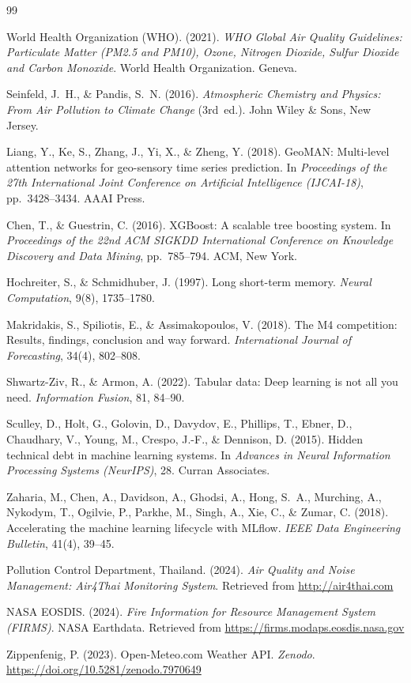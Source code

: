 \documentclass[12pt,a4paper]{report}
\begin{document}
\begin{thebibliography}{99}

World Health Organization (WHO). (2021).
\textit{WHO Global Air Quality Guidelines: Particulate Matter (PM2.5 and PM10), Ozone, Nitrogen Dioxide, Sulfur Dioxide and Carbon Monoxide}.
World Health Organization. Geneva.

Seinfeld, J.~H., \& Pandis, S.~N. (2016).
\textit{Atmospheric Chemistry and Physics: From Air Pollution to Climate Change} (3rd~ed.).
John Wiley \& Sons, New Jersey.

Liang, Y., Ke, S., Zhang, J., Yi, X., \& Zheng, Y. (2018).
GeoMAN: Multi-level attention networks for geo-sensory time series prediction.
In \textit{Proceedings of the 27th International Joint Conference on Artificial Intelligence (IJCAI-18)},
pp.~3428--3434. AAAI Press.

Chen, T., \& Guestrin, C. (2016).
XGBoost: A scalable tree boosting system.
In \textit{Proceedings of the 22nd ACM SIGKDD International Conference on Knowledge Discovery and Data Mining},
pp.~785--794. ACM, New York.

Hochreiter, S., \& Schmidhuber, J. (1997).
Long short-term memory.
\textit{Neural Computation}, 9(8), 1735--1780.

Makridakis, S., Spiliotis, E., \& Assimakopoulos, V. (2018).
The M4 competition: Results, findings, conclusion and way forward.
\textit{International Journal of Forecasting}, 34(4), 802--808.

Shwartz-Ziv, R., \& Armon, A. (2022).
Tabular data: Deep learning is not all you need.
\textit{Information Fusion}, 81, 84--90.

Sculley, D., Holt, G., Golovin, D., Davydov, E., Phillips, T., Ebner, D.,
Chaudhary, V., Young, M., Crespo, J.-F., \& Dennison, D. (2015).
Hidden technical debt in machine learning systems.
In \textit{Advances in Neural Information Processing Systems (NeurIPS)}, 28.
Curran Associates.

Zaharia, M., Chen, A., Davidson, A., Ghodsi, A., Hong, S.~A., Murching, A.,
Nykodym, T., Ogilvie, P., Parkhe, M., Singh, A., Xie, C., \& Zumar, C. (2018).
Accelerating the machine learning lifecycle with MLflow.
\textit{IEEE Data Engineering Bulletin}, 41(4), 39--45.

Pollution Control Department, Thailand. (2024).
\textit{Air Quality and Noise Management: Air4Thai Monitoring System}.
Retrieved from \url{http://air4thai.com}

NASA EOSDIS. (2024).
\textit{Fire Information for Resource Management System (FIRMS)}.
NASA Earthdata. Retrieved from \url{https://firms.modaps.eosdis.nasa.gov}

Zippenfenig, P. (2023).
Open-Meteo.com Weather API.
\textit{Zenodo}. \url{https://doi.org/10.5281/zenodo.7970649}

\end{thebibliography}
\end{document}
